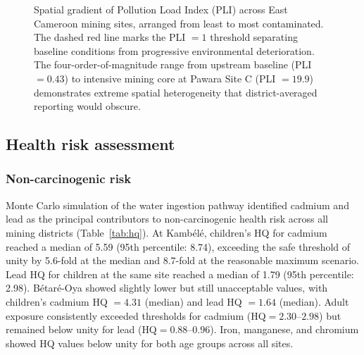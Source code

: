 \documentclass[preprint,12pt,number]{elsarticle}
\begin{document}
\begin{figure}[H]
\centering
{}
\caption{Spatial gradient of Pollution Load Index (PLI) across East Cameroon mining sites, arranged from least to most contaminated. The dashed red line marks the PLI $= 1$ threshold separating baseline conditions from progressive environmental deterioration. The four-order-of-magnitude range from upstream baseline (PLI $= 0.43$) to intensive mining core at Pawara Site C (PLI $= 19.9$) demonstrates extreme spatial heterogeneity that district-averaged reporting would obscure.}
\label{fig:pli}
\end{figure}


\subsection{Health risk assessment}

\subsubsection{Non-carcinogenic risk}

Monte Carlo simulation of the water ingestion pathway identified cadmium and lead as the principal contributors to non-carcinogenic health risk across all mining districts (Table~\ref{tab:hq}). At Kamb\'{e}l\'{e}, children's HQ for cadmium reached a median of 5.59 (95th percentile: 8.74), exceeding the safe threshold of unity by 5.6-fold at the median and 8.7-fold at the reasonable maximum scenario. Lead HQ for children at the same site reached a median of 1.79 (95th percentile: 2.98). B\'{e}tar\'{e}-Oya showed slightly lower but still unacceptable values, with children's cadmium HQ $= 4.31$ (median) and lead HQ $= 1.64$ (median). Adult exposure consistently exceeded thresholds for cadmium ($\text{HQ} = 2.30$--$2.98$) but remained below unity for lead ($\text{HQ} = 0.88$--$0.96$). Iron, manganese, and chromium showed HQ values below unity for both age groups across all sites.
\end{document}
